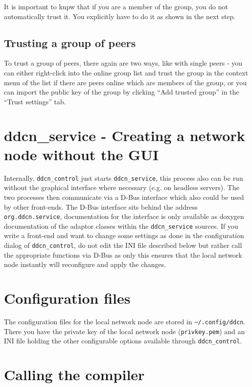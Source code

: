 \documentclass[a4paper,9pt]{scrartcl}
\begin{document}
It is important to knpw that if you are a member of the group, you do not automatically trust it. You explicitly have to do it as shown in the next step.

\subsection{Trusting a group of peers}

To trust a group of peers, there again are two ways, like with single peers - you can either right-click into the online group list and trust the group in the context menu of the list if there are peers online which are members of the group, or you can import the public key of the group by clicking ``Add trusted group'' in the ``Trust settings'' tab.

\section{ddcn\_service - Creating a network node without the GUI}

Internally, \texttt{ddcn\_control} just starts \texttt{ddcn\_service}, this process also can be run without the graphical interface where necessary (e.g. on headless servers). The two processes then communicate via a D-Bus interface which also could be used by other front-ends. The D-Bus interface sits behind the address \texttt{org.ddcn.service}, documentation for the interface is only available as doxygen documentation of the adaptor classes within the \texttt{ddcn\_service} sources. If you write a front-end and want to change some settings as done in the configuration dialog of \texttt{ddcn\_control}, do not edit the INI file described below but rather call the appropriate functions via D-Bus as only this ensures that the local network node instantly will reconfigure and apply the changes.


\section{Configuration files}

The configuration files for the local network node are stored in \texttt{\textasciitilde/.config/ddcn}. There you have the private key of the local network node (\texttt{privkey.pem}) and an INI file holding the other configurable options available through \texttt{ddcn\_control}.

\section{Calling the compiler}
\end{document}
